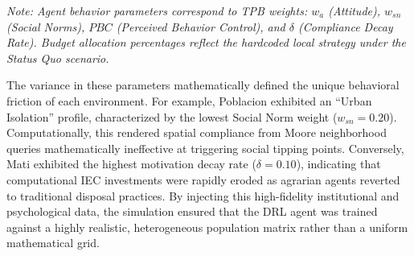 \begin{table}[H]
    \centering
    \caption{Calibrated Behavioral Weights and Base-Layer Allocation Strategies}
    \label{tab:behavioral_parameters}
    \vspace{1ex}
    
    \raggedright
    \footnotesize
    \textit{Note: Agent behavior parameters correspond to TPB weights: $w_a$ (Attitude), $w_{sn}$ (Social Norms), $PBC$ (Perceived Behavior Control), and $\delta$ (Compliance Decay Rate). Budget allocation percentages reflect the hardcoded local strategy under the Status Quo scenario.}
\end{table}

The variance in these parameters mathematically defined the unique behavioral friction of each environment. For example, Poblacion exhibited an ``Urban Isolation'' profile, characterized by the lowest Social Norm weight ($w_{sn} = 0.20$). Computationally, this rendered spatial compliance from Moore neighborhood queries mathematically ineffective at triggering social tipping points. Conversely, Mati exhibited the highest motivation decay rate ($\delta = 0.10$), indicating that computational IEC investments were rapidly eroded as agrarian agents reverted to traditional disposal practices. By injecting this high-fidelity institutional and psychological data, the simulation ensured that the DRL agent was trained against a highly realistic, heterogeneous population matrix rather than a uniform mathematical grid.